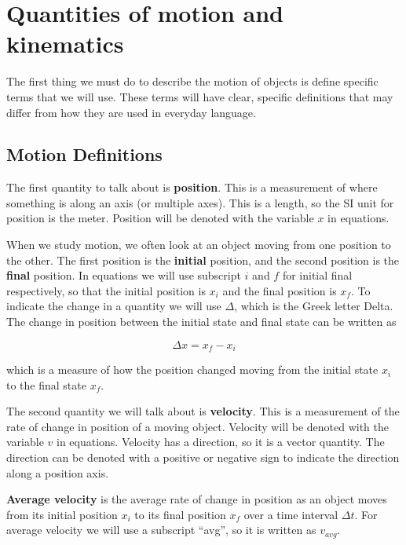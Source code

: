 \documentclass[12pt]{book}
\begin{document}
\chapter{Quantities of motion and kinematics}
\setcounter{example}{1}
\addtocounter{chp}{1}

The first thing we must do to describe the motion of objects is define specific terms that we will use. These terms will have clear, specific definitions that may differ from how they are used in everyday language. 

\section{Motion Definitions}

The first quantity to talk about is \textbf{position}. This is a measurement of where something is along an axis (or multiple axes). This is a length, so the SI unit for position is the meter. Position will be denoted with the variable $x$ in equations.

When we study motion, we often look at an object moving from one position to the other. The first position is the \textbf{initial} position, and the second position is the \textbf{final} position. In equations we will use subscript $i$ and $f$ for initial final respectively, so that the initial position is $x_i$ and the final position is $x_f$. To indicate the change in a quantity we will use $\Delta$, which is the Greek letter Delta. The change in position between the initial state and final state can be written as

\begin{equation}
\Delta x = x_f - x_i
\end{equation}

which is a measure of how the position changed moving from the initial state $x_i$ to the final state $x_f$. 

The second quantity we will talk about is \textbf{velocity}. This is a measurement of the rate of change in position of a moving object.  Velocity will be denoted with the variable $v$ in equations. Velocity has a direction, so it is a vector quantity. The direction can be denoted with a positive or negative sign to indicate the direction along a position axis.

\textbf{Average velocity} is the average rate of change in position as an object moves from its initial position $x_i$ to its final position $x_f$ over a time interval $\Delta t$. For average velocity we will use a subscript ``avg'', so it is written as $v_{avg}$. 
\end{document}
